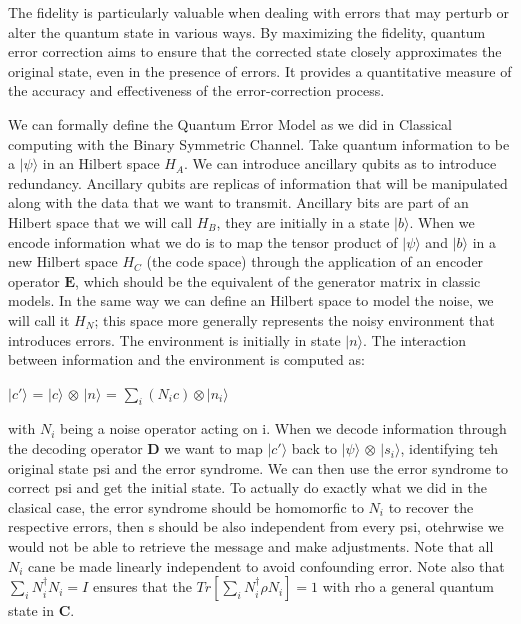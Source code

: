 \documentclass[12pt]{report}
\begin{document}
	\begin{minipage}{1 \textwidth}
		
		The fidelity is particularly valuable when dealing with errors that may perturb or alter the quantum state in various ways. By maximizing the fidelity, quantum error correction aims to ensure that the corrected state closely approximates the original state, even in the presence of errors. It provides a quantitative measure of the accuracy and effectiveness of the error-correction process. \newline
		
		We can formally define the Quantum Error Model as we did in Classical computing with the Binary Symmetric Channel. Take quantum information to be a $|\psi \rangle$ in an Hilbert space $\textit{H}_A$. We can introduce ancillary qubits as to introduce redundancy. Ancillary qubits are replicas of information that will be manipulated along with the data that we want to transmit.
		Ancillary bits are part of an Hilbert space that we will call $\textit{H}_B$, they are initially in a state $|b \rangle$. When we encode information what we do is to map the tensor product of $|\psi \rangle$ and $|b \rangle$ in a new Hilbert space $\textit{H}_C$ (the code space) through the application of an encoder operator $\textbf{E}$, which should be the equivalent of the generator matrix in classic models. In the same way we can define an Hilbert space to model the noise, we will call it $\textit{H}_N$; this space more generally represents the noisy environment that introduces errors. The environment is initially in state $|n \rangle$. The interaction between information and the environment is computed as:\newline
		
		\begin{center}
			$|c' \rangle$ = $|c \rangle$ $\otimes$ $|n \rangle$ = $\sum_{i} (N_i c) \otimes |n_i \rangle $
		\end{center}
		
	    with $N_i$ being a noise operator acting on i.
	    When we decode information through the decoding operator $\textbf{D}$ we want to map $|c' \rangle$ back to $|\psi \rangle$ $\otimes$ $|s_i \rangle$, identifying teh original state psi and the error syndrome. We can then use the error syndrome to correct psi and get the initial state. To actually do exactly what we did in the clasical case, the error syndrome should be homomorfic to $N_i$ to recover the respective errors, then s should be also independent from every psi, otehrwise we would not be able to retrieve the message and make adjustments. Note that all $N_i$ cane be made linearly independent to avoid confounding error. Note also that $\sum_{i} N_i^{\dagger} N_i= I$ ensures that the $Tr[\sum_{i} N_i^{\dagger} \rho N_i]= 1$ with rho a general quantum state in  $\textbf{C}$. \newline
	    

\end{minipage}
\end{document}
